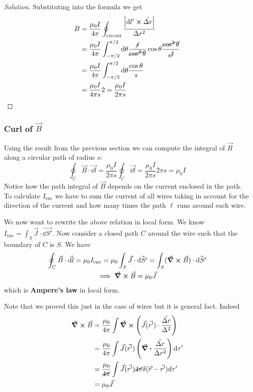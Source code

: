 \documentclass[12pt]{extarticle}
\begin{document}
\begin{proof}[Solution]
	Substituting into the formula we get
	\begin{align}
		B & = \frac{\mu_0 I}{4 \pi} \oint_\text{circuit} \frac{\abs{\dd l' \cross \hat{\Delta r}}}{\Delta r^2}                                                           \\
		  & = \frac{\mu_0 I}{4 \pi} \int_{-\pi/2}^{\pi/2} \dd \theta \frac{\cancel{s}}{\cancel{\cos^2 \theta}} \cos \theta \frac{\cancel{\cos^2 \theta}}{s^{\cancel{2}}} \\
		  & = \frac{\mu_0 I}{4 \pi} \int_{-\pi/2}^{\pi/2} \dd \theta \frac{\cos \theta}{s}                                                                               \\
		  & = \frac{\mu_0 I}{4 \pi s} 2 = \frac{\mu_0 I}{2 \pi s}
	\end{align}
\end{proof}


\subsubsection{Curl of \texorpdfstring{$\vec B$}{B}}

Using the result from the previous section we can compute the integral of $\vec B$ along a circular path of radius $s$:
\begin{equation}
	\oint_C \vec B \cdot \vec{\dd l} =
	\frac{\mu_0 I}{2 \pi s} \oint_C \vec{\dd l} =
	\frac{\mu_0 I}{2 \pi s} 2 \pi s = \mu_0 I
\end{equation}
Notice how the path integral of $\vec B$ depends on the current enclosed in the path.
To calculate $I_\text{enc}$ we have to sum the current of all wires taking in account
for the direction of the current and how many times the path $\ell$ runs around each wire.

We now want to rewrite the above relation in local form.
We know $I_\text{enc} = \int_S \vec J \cdot \vec{\dd S'}$.
Now consider a closed path $C$ around the wire such that the boundary of $C$ is $S$.
We have
\begin{gather}
	\oint_C \vec B \cdot \vec{\dd l} = \mu_0 I_\text{enc} = \mu_0 \int_S \vec J \cdot \vec{\dd S'} = \int_S (\curl \vec B) \cdot \vec{\dd S'} \\
	\implies \curl \vec B = \mu_0 \vec J
\end{gather}
which is \textbf{Ampere's law} in local form.

Note that we proved this just in the case of wires but it is general fact.
Indeed
\begin{align}
	\curl \vec B & = \frac{\mu_0}{4 \pi} \int \curl \left( \vec J(\vec{r '}) \cdot \frac{\hat{\Delta r}}{\Delta^2}\right)       \\
	             & = \frac{\mu_0}{4 \pi} \int \vec J(\vec{r '}) \left( \div \frac{\hat{\Delta r}}{\Delta r^2} \right) \dd \tau' \\
	             & = \frac{\mu_0}{\cancel{4 \pi}} \int \vec J(\vec{r '}) \cancel {4 \pi} \delta(\vec r - \vec{r '}) \dd \tau'   \\
	             & = \mu_0 \vec J
\end{align}
\end{document}
